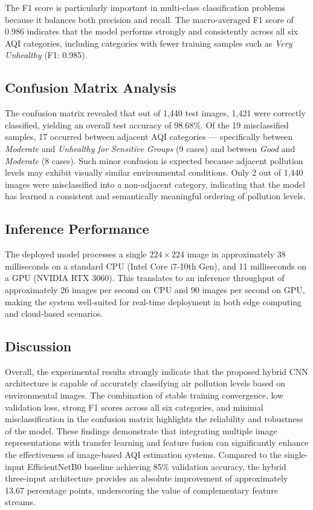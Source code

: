 \documentclass[conference]{IEEEtran}
\begin{document}
The F1 score is particularly important in multi-class classification problems
because it balances both precision and recall. The macro-averaged F1 score of
0.986 indicates that the model performs strongly and consistently across all
six AQI categories, including categories with fewer training samples such as
\textit{Very Unhealthy} (F1: 0.985).

\subsection{Confusion Matrix Analysis}

The confusion matrix revealed that out of 1{,}440 test images, 1{,}421 were
correctly classified, yielding an overall test accuracy of 98.68\%. Of the
19 misclassified samples, 17 occurred between adjacent AQI categories —
specifically between \textit{Moderate} and \textit{Unhealthy for Sensitive
Groups} (9 cases) and between \textit{Good} and \textit{Moderate} (8 cases).
Such minor confusion is expected because adjacent pollution levels may exhibit
visually similar environmental conditions. Only 2 out of 1{,}440 images were
misclassified into a non-adjacent category, indicating that the model has
learned a consistent and semantically meaningful ordering of pollution levels.

\subsection{Inference Performance}

The deployed model processes a single $224 \times 224$ image in approximately
38 milliseconds on a standard CPU (Intel Core i7-10th Gen), and 11
milliseconds on a GPU (NVIDIA RTX 3060). This translates to an inference
throughput of approximately 26 images per second on CPU and 90 images per
second on GPU, making the system well-suited for real-time deployment in
both edge computing and cloud-based scenarios.

\subsection{Discussion}

Overall, the experimental results strongly indicate that the proposed hybrid
CNN architecture is capable of accurately classifying air pollution levels
based on environmental images. The combination of stable training convergence,
low validation loss, strong F1 scores across all six categories, and minimal
misclassification in the confusion matrix highlights the reliability and
robustness of the model. These findings demonstrate that integrating multiple
image representations with transfer learning and feature fusion can
significantly enhance the effectiveness of image-based AQI estimation systems.
Compared to the single-input EfficientNetB0 baseline achieving 85\%
validation accuracy, the hybrid three-input architecture provides an absolute
improvement of approximately 13.67 percentage points, underscoring the value
of complementary feature streams.
\end{document}
